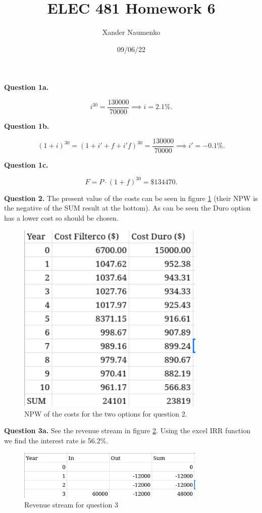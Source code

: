 \documentclass[letterpaper, reqno,11pt]{article}
\begin{document}
\title{ELEC 481 Homework 6}
\date{09/06/22}
\author{Xander Naumenko}
\maketitle

{\noindent\bf Question 1a.} 

\[
i^{30}=\frac{130000}{70000}\implies i=2.1\%
.\]

{\noindent\bf Question 1b.} 

\[
    (1+i)^{30}=\left( 1+i'+f+i'f \right)^{30}=\frac{130000}{70000}\implies i'=-0.1\%
.\]

{\noindent\bf Question 1c.} 

\[
F=P \cdot (1+f)^{30}=\$134470
.\]

{\noindent\bf Question 2.} The present value of the costs can be seen in figure \ref{fig:q2} (their NPW is the negative of the SUM result at the bottom). As can be seen the Duro option has a lower cost so should be chosen. 

\begin{figure}[htpb]
    \centering
    \includegraphics[width=0.8\textwidth]{q2}
    \caption{NPW of the costs for the two options for question 2. }
    \label{fig:q2}
\end{figure}

{\noindent\bf Question 3a.} See the revenue stream in figure \ref{fig:q3}. Using the excel IRR function we find the interest rate is 56.2\%. 

\begin{figure}[htpb]
    \centering
    \includegraphics[width=0.8\textwidth]{q3}
    \caption{Revenue stream for question 3}
    \label{fig:q3}
\end{figure}
\end{document}
